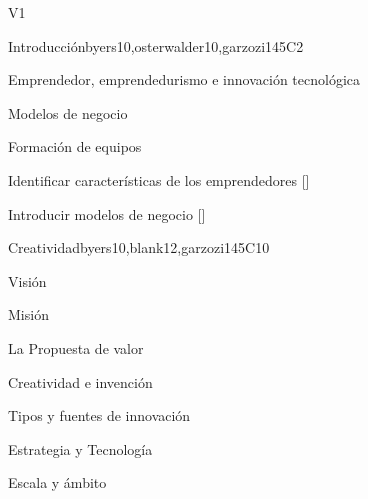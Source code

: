 \begin{syllabus}
\begin{competences}{V1}
   \end{competences}
   
   
   
   \begin{unit}{}{Introducción}{byers10,osterwalder10,garzozi14}{5}{C2}
   \begin{topics}
         \item Emprendedor, emprendedurismo e innovación tecnológica
         \item Modelos de negocio
         \item Formación de equipos
      \end{topics}
   
       \begin{learningoutcomes} 
         \item Identificar características de los emprendedores  [\Familiarity]
         \item Introducir modelos de negocio  [\Familiarity]
       \end{learningoutcomes} 
   \end{unit}
   
   \begin{unit}{}{Creatividad}{byers10,blank12,garzozi14}{5}{C10}
   \begin{topics}
         \item Visión
         \item Misión
         \item La Propuesta de valor
         \item Creatividad e invención
         \item Tipos y fuentes de innovación
         \item Estrategia y Tecnología
         \item Escala y ámbito
      \end{topics}
   

\end{unit}
\end{syllabus}
